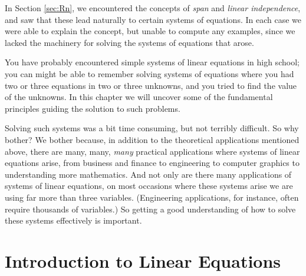 In Section \ref{sec:Rn}, we encountered the concepts of \textit{span} and \textit{linear independence}, and saw that these lead naturally to certain systems of equations. %
In each case we were able to explain the concept, but unable to compute any examples, since we lacked the machinery for solving the systems of equations that arose.


You have probably encountered simple systems of linear equations in high school; you can might be able to remember solving systems of equations where you had two or three equations in two or three unknowns, and you tried to find the value of the unknowns. In this chapter we will uncover some of the fundamental principles guiding the solution to such problems.

Solving such systems was a bit time consuming, but not terribly difficult. So why bother? We bother because, in addition to the theoretical applications mentioned above, there are many, many, \textit{many} practical applications where systems of linear equations arise, from business and finance to engineering to computer graphics to understanding more mathematics. And not only are there many applications of systems of linear equations, on most occasions where these systems arise we are using far more than three variables. (Engineering applications, for instance, often require thousands of variables.) So getting a good understanding of how to solve these systems effectively is important.\\

\section{Introduction to Linear Equations}\label{sec:intro}


